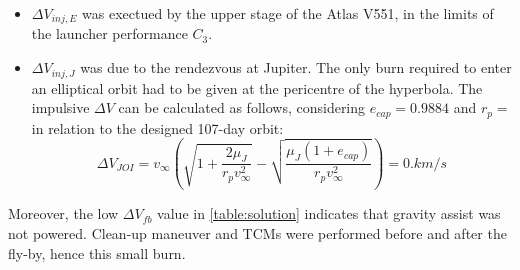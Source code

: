 \begin{itemize}
    \item $\Delta V_{inj,E}$ was exectued by the upper stage of the Atlas V551, in the limits of the launcher performance $C_3$.
    \item $\Delta V_{inj,J}$ was due to the rendezvous at Jupiter. The only burn required to enter an elliptical orbit had to be given at the pericentre of the hyperbola. The impulsive $\Delta V$ can be calculated as follows, considering $e_{cap} = 0.9884$ and $r_p = $in relation to the designed 107-day orbit: 
    \begin{equation}
        \Delta V_{JOI} = v_{\infty} \left( \sqrt{1 + \frac{2\mu_{J}}{r_p v_{\infty}^2}} - \sqrt{\frac{\mu_{J} (1 + e_{cap})}{r_p v_{\infty}^2}}\right) =  0.km/s 
    \end{equation}
\end{itemize}
Moreover, the low $\Delta V_{fb}$ value in \autoref{table:solution} indicates that gravity assist was not powered. Clean-up maneuver and TCMs were performed before and after the fly-by, hence this small burn.



\cite{fact_sheet}

